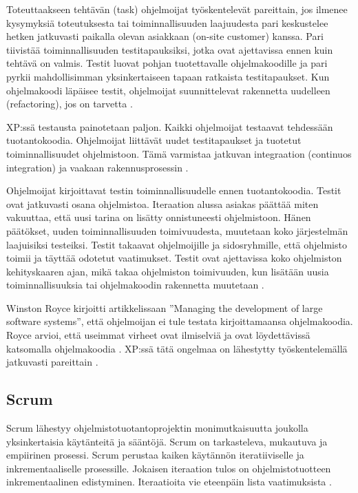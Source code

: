 \documentclass[finnish]{tktltiki2}
\theoremstyle{definition}
\theoremstyle{remark}
\begin{document}
Toteuttaakseen tehtävän (task) ohjelmoijat työskentelevät pareittain, jos ilmenee kysymyksiä toteutuksesta tai toiminnallisuuden laajuudesta pari keskustelee hetken jatkuvasti paikalla olevan asiakkaan (on-site customer) kanssa. Pari tiivistää toiminnallisuuden testitapauksiksi, jotka ovat ajettavissa ennen kuin tehtävä on valmis. Testit luovat pohjan tuotettavalle ohjelmakoodille ja pari pyrkii mahdollisimman yksinkertaiseen tapaan ratkaista testitapaukset. Kun ohjelmakoodi läpäisee testit, ohjelmoijat suunnittelevat rakennetta uudelleen (refactoring), jos on tarvetta \cite{BEC99}.     

XP:ssä testausta painotetaan paljon. Kaikki ohjelmoijat testaavat tehdessään tuotantokoodia. Ohjelmoijat liittävät uudet testitapaukset ja tuotetut toiminnallisuudet ohjelmistoon. Tämä varmistaa jatkuvan integraation (continuos integration) ja vaakaan rakennusprosessin \cite{FOW01a}.

Ohjelmoijat kirjoittavat testin toiminnallisuudelle ennen tuotantokoodia. Testit ovat jatkuvasti osana ohjelmistoa. Iteraation alussa asiakas päättää miten vakuuttaa, että uusi tarina on lisätty onnistuneesti ohjelmistoon. Hänen päätökset, uuden toiminnallisuuden toimivuudesta, muutetaan koko järjestelmän laajuisiksi testeiksi. Testit takaavat ohjelmoijille ja sidosryhmille, että ohjelmisto toimii ja täyttää odotetut vaatimukset. Testit ovat ajettavissa koko ohjelmiston kehityskaaren ajan, mikä takaa ohjelmiston toimivuuden, kun lisätään uusia toiminnallisuuksia tai ohjelmakoodin rakennetta muutetaan \cite{BEC99}.

Winston Royce kirjoitti artikkelissaan ''Managing the development of large software systems'', että ohjelmoijan ei tule testata kirjoittamaansa ohjelmakoodia. Royce arvioi, että useimmat virheet ovat ilmiselviä ja ovat löydettävissä katsomalla ohjelmakoodia \cite{ROY70}. XP:ssä tätä ongelmaa on lähestytty työskentelemällä jatkuvasti pareittain \cite{BEC99}. 


\subsection{Scrum}

Scrum lähestyy ohjelmistotuotantoprojektin monimutkaisuutta joukolla yksinkertaisia käytänteitä ja sääntöjä. Scrum on tarkasteleva, mukautuva ja empiirinen prosessi. Scrum perustaa kaiken käytännön iteratiiviselle ja inkrementaaliselle prosessille. Jokaisen iteraation tulos on ohjelmistotuotteen inkrementaalinen edistyminen. Iteraatioita vie eteenpäin lista vaatimuksista \cite{SCH09}. 
\end{document}
